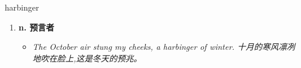 
\begin{frame}
{\huge harbinger}
\begin{center}
\begin{enumerate}\Large
  \item \textbf{n. 预言者}
  \begin{itemize}
    \item \em{\Large{The October air stung my cheeks, a harbinger of winter. 十月的寒风凛冽地吹在脸上,这是冬天的预兆。}}
  \end{itemize}
\end{enumerate}
\end{center}
\end{frame}
